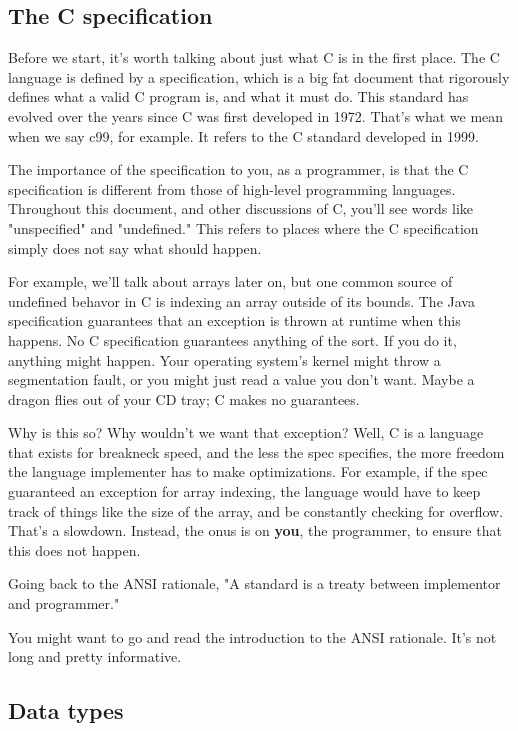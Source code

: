 \documentclass[ebook,11pt,oneside,openany]{memoir}
\begin{document}
\subsection{The C specification}

Before we start, it's worth talking about just what C is in the first place. The C language is defined by a specification, which is a big fat document that rigorously defines what a valid C program is, and what it must do. This standard has evolved over the years since C was first developed in 1972. That's what we mean when we say c99, for example. It refers to the C standard developed in 1999. 

The importance of the specification to you, as a programmer, is that the C specification is different from those of high-level programming languages. Throughout this document, and other discussions of C, you'll see words like "unspecified" and "undefined." This refers to places where the C specification simply does not say what should happen. 

For example, we'll talk about arrays later on, but one common source of undefined behavor in C is indexing an array outside of its bounds. The Java specification guarantees that an exception is thrown at runtime when this happens. No C specification guarantees anything of the sort. If you do it, anything might happen. Your operating system's kernel might throw a segmentation fault, or you might just read a value you don't want. Maybe a dragon flies out of your CD tray; C makes no guarantees.

Why is this so? Why wouldn't we want that exception? Well, C is a language that exists for breakneck speed, and the less the spec specifies, the more freedom the language implementer has to make optimizations. For example, if the spec guaranteed an exception for array indexing, the language would have to keep track of things like the size of the array, and be constantly checking for overflow. That's a slowdown. Instead, the onus is on \textbf{you}, the programmer, to ensure that this does not happen.

Going back to the ANSI rationale, "A standard is a treaty between implementor and programmer."

You might want to go and read the introduction to the ANSI rationale. It's not long and pretty informative.

\subsection{Data types}
\end{document}
